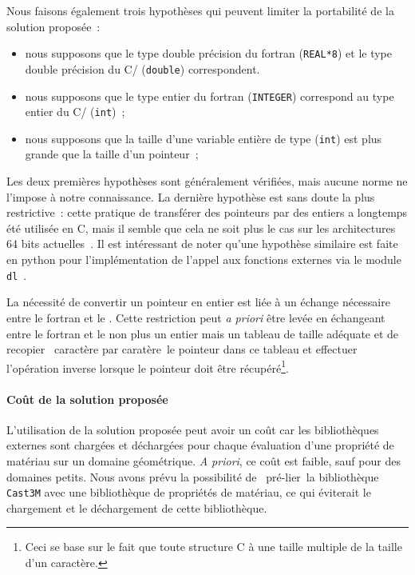 \documentclass[rectoverso,pleiades,pstricks,leqno,anti]{texmf/note_technique_2010}
\newcommand{\castem}{\texttt{Cast3M}}
\def\ifmonospace{\ifdim\fontdimen3\font=0pt }
\def\cpp{%
\ifmonospace%
    C++%
\else%
    C\kern-.1667em\raise.30ex\hbox{\smaller{++}}%
\fi%
\spacefactor1000 }
\begin{document}
Nous faisons également trois hypothèses qui peuvent limiter la portabilité de la solution
proposée~:
\begin{itemize}
\item nous supposons que le type double précision du fortran ({\tt REAL*8}) 
  et le type double précision du C/\cpp ({\tt double}) correspondent.
\item nous supposons que le type entier du fortran ({\tt INTEGER}) correspond au type 
  entier du C/\cpp ({\tt int})~;
\item nous supposons que la taille d'une variable entière de type ({\tt int}) est plus 
grande que la taille d'un pointeur~;
\end{itemize}

Les deux premières hypothèses sont généralement vérifiées, mais aucune
norme ne l'impose à notre connaissance. La dernière hypothèse est sans
doute la plus restrictive~: cette pratique de transférer des pointeurs
par des entiers a longtemps été utilisée en C, mais il semble que cela
ne soit plus le cas sur les architectures 64 bits
actuelles~\cite{foundation06:_gnu}. Il est intéressant de noter qu'une
hypothèse similaire est faite en python pour l'implémentation de l'appel
aux fonctions externes via le module {\tt
  dl}~\cite{python_librar_refer}.

La nécessité de convertir un pointeur en entier est liée à un échange
nécessaire entre le fortran et le \cpp. Cette restriction peut {\it a
  priori} être levée en échangeant entre le fortran et le \cpp non plus
un entier mais un tableau de taille adéquate et de recopier
\og~caractère par caratère~\fg le pointeur dans ce tableau et effectuer
l'opération inverse lorsque le pointeur doit être récupéré\footnote{Ceci
  se base sur le fait que toute structure C à une taille multiple de la
  taille d'un caractère.}.

\paragraph{Coût de la solution proposée} L'utilisation de la solution
proposée peut avoir un coût car les bibliothèques externes sont chargées
et déchargées pour chaque évaluation d'une propriété de matériau sur un
domaine géométrique. {\it A priori}, ce coût est faible, sauf pour des
domaines petits. Nous avons prévu la possibilité de \og~pré-lier~\fg la
bibliothèque \castem{} avec une bibliothèque de propriétés de matériau,
ce qui éviterait le chargement et le déchargement de cette bibliothèque.
\end{document}
